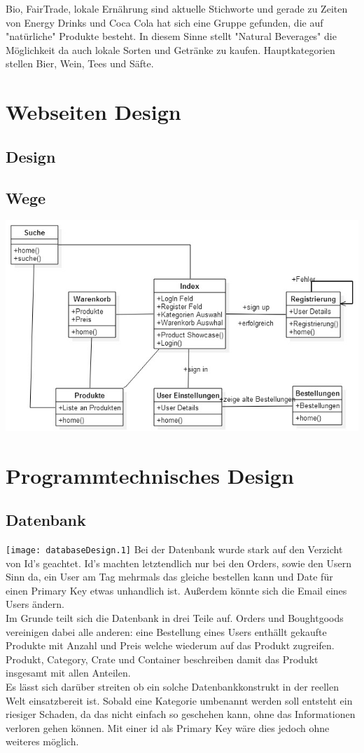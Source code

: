 \documentclass[a4paper, 11pt]{article}
\begin{document}
Bio, FairTrade, lokale Ernährung sind aktuelle Stichworte und gerade zu Zeiten von Energy Drinks und Coca Cola hat sich eine Gruppe gefunden, die auf "natürliche" Produkte besteht. In diesem Sinne stellt "Natural Beverages" die Möglichkeit da auch lokale Sorten und Getränke zu kaufen. Hauptkategorien stellen Bier, Wein, Tees und Säfte.  
\section{Webseiten Design}

\subsection{Design}

\subsection{Wege}
\includegraphics[width=\textwidth]{websiteWege.jpg}
\section{Programmtechnisches Design}

\subsection{Datenbank}
\texttt{[image: databaseDesign.1]}
Bei der Datenbank wurde stark auf den Verzicht von Id's geachtet. Id's machten letztendlich nur bei den Orders, sowie den Usern Sinn da, ein User am Tag mehrmals das gleiche bestellen kann und Date für einen Primary Key etwas unhandlich ist. Außerdem könnte sich die Email eines Users ändern. \\
Im Grunde teilt sich die Datenbank in drei Teile auf. Orders und Boughtgoods vereinigen dabei alle anderen: eine Bestellung eines Users enthällt gekaufte Produkte mit Anzahl und Preis welche wiederum auf das Produkt zugreifen. Produkt, Category, Crate und Container beschreiben damit das Produkt insgesamt mit allen Anteilen. \\
Es lässt sich darüber streiten ob ein solche Datenbankkonstrukt in der reellen Welt einsatzbereit ist. Sobald eine Kategorie umbenannt werden soll entsteht ein riesiger Schaden, da das nicht einfach so geschehen kann, ohne das Informationen verloren gehen können. Mit einer id als Primary Key wäre dies jedoch ohne weiteres möglich.
\end{document}
